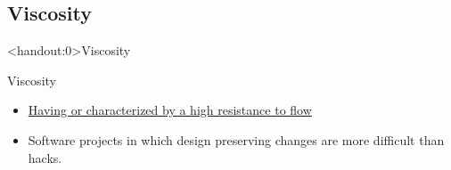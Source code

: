 \documentclass[xcolor=svgnames, handout]{beamer}
\begin{document}

\subsection{Viscosity}


{%
%
\begin{frame}<handout:0>{Viscosity}
\end{frame}
}

{%
%
\begin{frame}{Viscosity}

    \begin{itemize}
        \item \href{https://www.merriam-webster.com/dictionary/viscous}
            {Having or characterized by a high resistance to flow}
        \item<2-> Software projects in which design preserving changes are more
            difficult than hacks.
    \end{itemize}
\end{frame}
}

\end{document}
